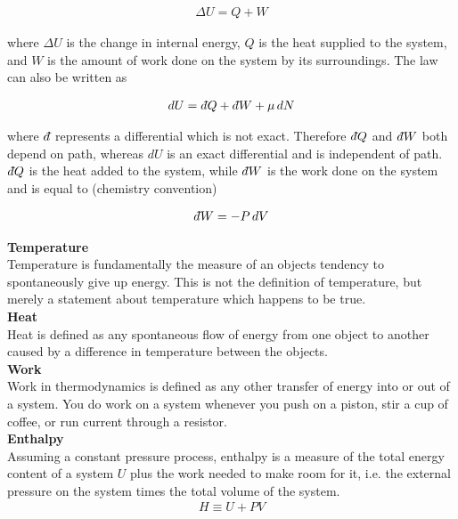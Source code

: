 \documentclass{article}
\newcommand{\dbar}{d\hspace*{-0.08em}\bar{}\hspace*{0.1em}}
\begin{document}
\begin{gather*}
    \Delta U = Q + W
\end{gather*}

\noindent where $\Delta U$ is the change in internal energy, $Q$ is the heat supplied to the system, and $W$ is the amount of work done on the system by its surroundings. The law can also be written as

\begin{gather*}
    dU = \dbar Q + \dbar W + \mu \, dN
\end{gather*}

\noindent where $\dbar$ represents a differential which is not exact. Therefore $\dbar Q$ and $\dbar W$ both depend on path, whereas $dU$ is an exact differential and is independent of path. $\dbar Q$ is the heat added to the system, while $\dbar W$ is the work done on the system and is equal to (chemistry convention)

\begin{gather*}
    \dbar W = -P\, dV
\end{gather*}

\noindent \textbf{Temperature} \\
\indent Temperature is fundamentally the measure of an objects tendency to spontaneously give up energy. This is not the definition of temperature, but merely a statement about temperature which happens to be true. \\

\noindent \textbf{Heat} \\
\indent Heat is defined as any spontaneous flow of energy from one object to another caused by a difference in temperature between the objects. \\

\noindent \textbf{Work} \\
\indent Work in thermodynamics is defined as any other transfer of energy into or out of a system. You do work on a system whenever you push on a piston, stir a cup of coffee, or run current through a resistor. 
\\

\noindent \textbf{Enthalpy} \\
\indent Assuming a constant pressure process, enthalpy is a measure of the total energy content of a system $U$ plus the work needed to make room for it, i.e. the external pressure on the system times the total volume of the system. 
\begin{gather*}
    H \equiv U + PV
\end{gather*}
\end{document}
